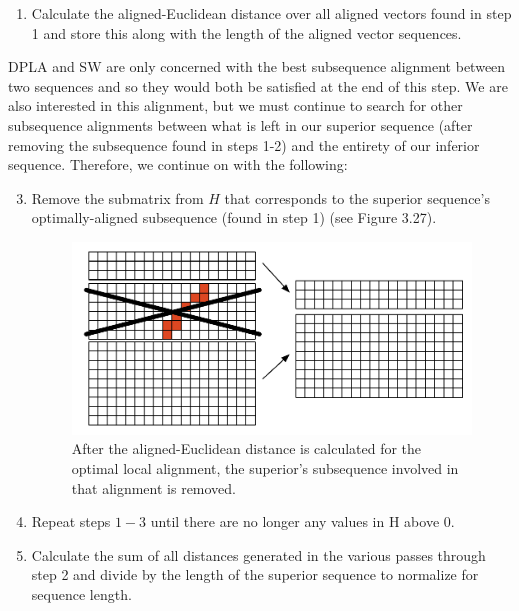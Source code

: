 \documentclass[12pt]{report} 	%
\numberwithin{figure}{chapter}
\numberwithin{table}{chapter}
\numberwithin{equation}{chapter}
\begin{document}
\begin{flushleft}
\begin{enumerate}
\item Calculate the aligned-Euclidean distance over all aligned vectors found in step 1 and store this along with the length of the aligned vector sequences.
\end{enumerate}
DPLA and SW are only concerned with the best subsequence alignment between two sequences and so they would both be satisfied at the end of this step. We are also interested in this alignment, but we must continue to search for other subsequence alignments between what is left in our superior sequence (after removing the subsequence found in steps 1-2) and the entirety of our inferior sequence. Therefore, we continue on with the following:
\begin{enumerate}
\setcounter{enumi}{2}
\item Remove the submatrix from $H$ that corresponds to the superior sequence's optimally-aligned subsequence (found in step 1) (see Figure 3.27).
\begin{figure}[h!]
\begin{center}
\includegraphics[scale=0.8]{SIC-DPLA_2}
\caption[Removing the optimal subsequence]{After the aligned-Euclidean distance is calculated for the optimal local alignment, the superior's subsequence involved in that alignment is removed.}
\end{center}
\end{figure}
\item Repeat steps $1-3$ until there are no longer any values in H above 0.
\item Calculate the sum of all distances generated in the various passes through step 2 and divide by the length of the superior sequence to normalize for sequence length.
\end{enumerate}


\end{flushleft}
\end{document}
